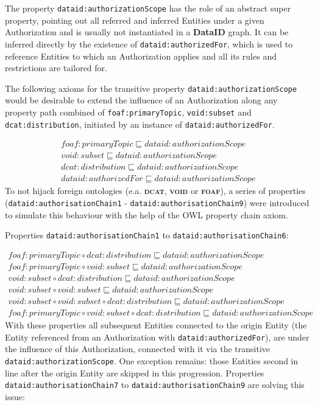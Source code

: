 \documentclass[a4paper,english,twoside,BCOR1.5cm,headsepline,DIV12,appendixprefix,final,12pt]{scrbook}
\newcommand{\dataid}{{\ttfamily\bfseries DataID}\xspace}
\newcommand{\void}{{\scshape\bfseries void}\xspace}
\newcommand{\dcat}{{\scshape\bfseries dcat}\xspace}
\newcommand{\foaf}{{\scshape\bfseries foaf}\xspace}
\newcommand{\prop}[1]{{{\texttt{#1}}}}
\begin{document}
The property \prop{dataid:authorizationScope} has the role of an abstract super property, pointing out all referred and inferred Entities under a given Authorization and is usually not instantiated in a \dataid graph. It can be inferred directly by the existence of  \prop{dataid:authorizedFor}, which is used to reference Entities to which an Authorization applies and all its rules and restrictions are tailored for.

The following axioms for the transitive property \prop{dataid:authorizationScope} would be desirable to extend the influence of an Authorization along any property path combined of \prop{foaf:primaryTopic}, \prop{void:subset} and \prop{dcat:distribution}, initiated by an instance of \prop{dataid:authorizedFor}.

{\footnotesize
\vspace*{-0.5cm}
\begin{align*}
foaf:primaryTopic \sqsubseteq dataid:authorizationScope\\
void:subset \sqsubseteq dataid:authorizationScope\\
dcat:distribution \sqsubseteq dataid:authorizationScope\\
dataid:authorizedFor \sqsubseteq dataid:authorizationScope
\end{align*}
}%
To not hijack foreign ontologies \cite{feeney2015linked} (e.a. \dcat, \void or \foaf), a series of properties (\prop{dataid:authorisationChain1} - \prop{dataid:authorisationChain9}) were introduced to simulate this behaviour with the help of the OWL property chain axiom. 

Properties \prop{dataid:authorisationChain1} to \prop{dataid:authorisationChain6}:

{\footnotesize
\vspace*{-0.5cm}
\begin{align*}
foaf:primaryTopic \circ dcat:distribution \sqsubseteq dataid:authorizationScope\\
foaf:primaryTopic \circ void:subset \sqsubseteq dataid:authorizationScope\\
void:subset \circ dcat:distribution \sqsubseteq dataid:authorizationScope\\
void:subset \circ void:subset \sqsubseteq dataid:authorizationScope\\
void:subset \circ void:subset \circ dcat:distribution \sqsubseteq dataid:authorizationScope\\
foaf:primaryTopic \circ void:subset \circ dcat:distribution \sqsubseteq dataid:authorizationScope
\end{align*}
}%
With these properties all subsequent Entities connected to the origin Entity (the Entity referenced from an Authorization with \prop{dataid:authorizedFor}), are under the influence of this Authorization, connected with it via the transitive \prop{dataid:authorizationScope}. One exception remains: those Entities second in line after the origin Entity are skipped in this progression.
Properties \prop{dataid:authorisationChain7} to \prop{dataid:authorisationChain9} are solving this issue:
\end{document}
